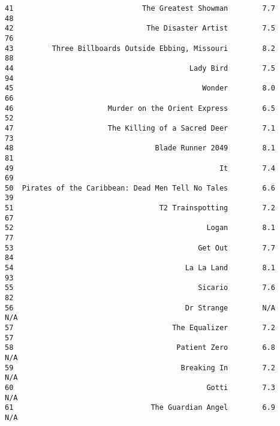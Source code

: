 \documentclass[11pt]{article}
\begin{document}
\begin{verbatim}
41                              The Greatest Showman        7.7        48
42                               The Disaster Artist        7.5        76
43         Three Billboards Outside Ebbing, Missouri        8.2        88
44                                         Lady Bird        7.5        94
45                                            Wonder        8.0        66
46                      Murder on the Orient Express        6.5        52
47                      The Killing of a Sacred Deer        7.1        73
48                                 Blade Runner 2049        8.1        81
49                                                It        7.4        69
50  Pirates of the Caribbean: Dead Men Tell No Tales        6.6        39
51                                  T2 Trainspotting        7.2        67
52                                             Logan        8.1        77
53                                           Get Out        7.7        84
54                                        La La Land        8.1        93
55                                           Sicario        7.6        82
56                                        Dr Strange        N/A       N/A
57                                     The Equalizer        7.2        57
58                                      Patient Zero        6.8       N/A
59                                       Breaking In        7.2       N/A
60                                             Gotti        7.3       N/A
61                                The Guardian Angel        6.9       N/A
    \end{verbatim}
\end{document}

